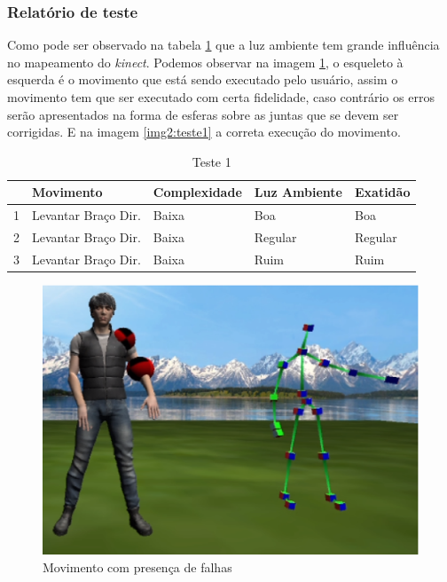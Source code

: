 \subsubsection{Relatório de teste}\label{sub:relteste1}
Como pode ser observado na tabela \ref{tab:teste1} que a luz ambiente tem grande influência no mapeamento do \textit{kinect}. Podemos
observar na imagem \ref{img:teste1}, o esqueleto à esquerda é o movimento
que está sendo executado pelo usuário, assim o movimento tem que ser executado
com certa fidelidade, caso contrário os erros serão apresentados na forma de esferas sobre as juntas que se devem ser corrigidas. E na imagem \ref{img2:teste1} a correta execução do movimento.

\begin{table}[H]
\centering
\caption{Teste 1}
\label{tab:teste1}
\begin{tabular}{@{}|c|c|l|l|l|@{}}
\toprule
\multicolumn{1}{|l|}{ } & \multicolumn{1}{l|}{\textbf{Movimento}} & \textbf{Complexidade} & \textbf{Luz Ambiente} & \textbf{Exatidão} \\ \midrule
1                                 & Levantar Braço Dir.                     & Baixa                 & Boa                   & Boa               \\ \midrule
2                                 & Levantar Braço Dir.                     & Baixa                 & Regular               & Regular           \\ \midrule
3                                 & Levantar Braço Dir.                     & Baixa                 & Ruim                  & Ruim              \\ \bottomrule
\end{tabular}
\end{table}


\begin{figure}[H]
\centering
\includegraphics [keepaspectratio=true,scale=0.60]{figuras/img2teste1.eps}
\caption{Movimento com presença de falhas}
\label{img:teste1}
\end{figure}

